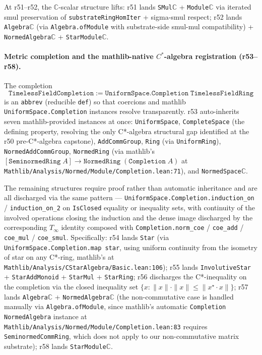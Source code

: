 \documentclass[11pt,a4paper]{amsart}
\theoremstyle{plain}
\theoremstyle{definition}
\begin{document}
At r51--r52, the $\mathbb{C}$-scalar structure lifts: r51 lands \texttt{SMul}\;$\mathbb{C}$ + \texttt{Module}\;$\mathbb{C}$ via iterated smul preservation of \texttt{substrateRingHomIter} + sigma-smul respect; r52 lands \texttt{Algebra}\;$\mathbb{C}$ (via \texttt{Algebra.ofModule} with substrate-side smul-mul compatibility) + \texttt{NormedAlgebra}\;$\mathbb{C}$ + \texttt{StarModule}\;$\mathbb{C}$.

\paragraph{Metric completion and the mathlib-native \texorpdfstring{$C^*$}{C*}-algebra registration (r53--r58).} The completion
\[
\texttt{TimelessFieldCompletion} \;:=\; \texttt{UniformSpace.Completion}\;\texttt{TimelessFieldRing}
\]
is an \texttt{abbrev} (reducible \texttt{def}) so that coercions and mathlib \texttt{UniformSpace.Completion} instances resolve transparently. r53 auto-inherits seven mathlib-provided instances at once: \texttt{UniformSpace}, \texttt{CompleteSpace} (the defining property, resolving the only C*-algebra structural gap identified at the r50 pre-C*-algebra capstone), \texttt{AddCommGroup}, \texttt{Ring} (via \texttt{UniformRing}), \texttt{NormedAddCommGroup}, \texttt{NormedRing} (via mathlib's $[\texttt{SeminormedRing}\;A] \to \texttt{NormedRing}\;(\texttt{Completion}\;A)$ at \texttt{Mathlib/Analysis/Normed/Module/Completion.lean:71}), and \texttt{NormedSpace}\;$\mathbb{C}$.

The remaining structures require proof rather than automatic inheritance and are all discharged via the same pattern --- \texttt{UniformSpace.Completion.induction\_on} / \texttt{induction\_on\_2} on \texttt{IsClosed} equality or inequality sets, with continuity of the involved operations closing the induction and the dense image discharged by the corresponding $T_\infty$ identity composed with \texttt{Completion.norm\_coe} / \texttt{coe\_add} / \texttt{coe\_mul} / \texttt{coe\_smul}. Specifically: r54 lands \texttt{Star} (via \texttt{UniformSpace.Completion.map star}, using uniform continuity from the isometry of star on any C*-ring, mathlib's  at \texttt{Mathlib/Analysis/CStarAlgebra/Basic.lean:106}); r55 lands \texttt{InvolutiveStar} + \texttt{StarAddMonoid} + \texttt{StarMul} + \texttt{StarRing}; r56 discharges the C*-inequality on the completion via the closed inequality set $\{x : \|x\|\cdot\|x\| \le \|x^\star \cdot x\|\}$; r57 lands \texttt{Algebra}\;$\mathbb{C}$ + \texttt{NormedAlgebra}\;$\mathbb{C}$ (the non-commutative case is handled manually via \texttt{Algebra.ofModule}, since mathlib's automatic \texttt{Completion} \texttt{NormedAlgebra} instance at \texttt{Mathlib/Analysis/Normed/Module/Completion.lean:83} requires \texttt{SeminormedCommRing}, which does not apply to our non-commutative matrix substrate); r58 lands \texttt{StarModule}\;$\mathbb{C}$.
\end{document}
